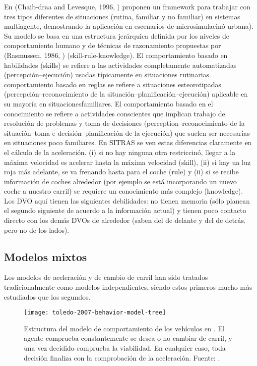 En (Chaib-draa and Levesque, 1996, ) proponen un framework para trabajar con tres tipos diferentes de situaciones (rutina, familiar y no familiar) en sistemas multiagente, demostrando la aplicación en escenarios de microsimulacinó urbana). Su modelo se basa en una estructura jerárquica definida por los niveles de comportamiento humano y de técnicas de razonamiento propuestas por (Rasmussen, 1986, ) (skill-rule-knowledge). El comportamiento basado en habilidades (skills) se refiere a las actividades completamente automatizadas (percepción--ejecución) usadas típicamente en situaciones rutinarias. comportamiento basado en reglas se refiere a situaciones esteorotipadas (percepción--reconocimiento de la situación--planificación--ejecución) aplicable en su mayoría en situacionesfamiliares. El comportamiento basado en el conocimiento se refiere a actividades conscientes que implican trabajo de resolución de problemas y toma de decisiones (perception--reconocimiento de la situación--toma e decisión--planificación de la ejecución) que suelen ser necesarias en situaciones poco familiares. En SITRAS se ven estas diferencias claramente en el cálculo de la aceleración. (i) si no hay ninguna otra restriccinó, llegar a la máxima velocidad es acelerar hasta la máxima velocidad (skill), (ii) si hay ua luz roja más adelante, se va frenando hasta para el coche (rule) y (ii) si se recibe información de coches alrededor (por ejemplo se está incorporando un nuevo coche a nuestro carril) se requiere un conocimiento más complejo (knowledge). Los DVO aquí tienen las siguientes debilidades: no tienen memoria (sólo planean el segundo siguiente de acuerdo a la información actual) y tienen poco contacto directo con los demás DVOs de alrededor (saben del de delante y del de detrás, pero no de los lados).


\subsection{Modelos mixtos}

Los modelos de aceleración y de cambio de carril han sido tratados tradicionalmente como modelos independientes, siendo estos primeros mucho más estudiados que los segundos.

\begin{figure}
	\texttt{[image: toledo-2007-behavior-model-tree]}
	\caption{Estructura del modelo de comportamiento de los vehículos en \cite{Toledo2007}. El agente comprueba constantemente se desea o no cambiar de carril, y una vez decidido comprueba la viabilidad. En cualquier caso, toda decisión finaliza con la comprobación de la aceleración. Fuente: \cite{Toledo2007}.}
	\label{fig:toledo-2007-behavior-model-tree}
\end{figure}

